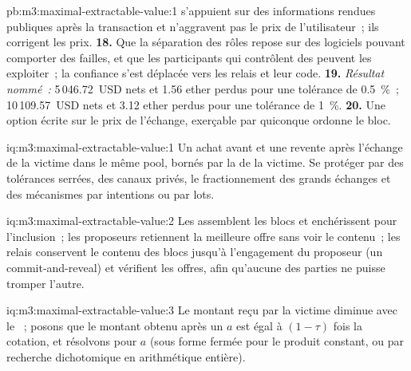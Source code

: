 \begin{solution}{pb:m3:maximal-extractable-value:1}
s'appuient sur des informations rendues publiques après la transaction et n'aggravent pas le prix de l'utilisateur~; ils corrigent les prix. \textbf{18.} Que la
séparation des rôles repose sur des logiciels pouvant comporter des failles, et que les participants qui contrôlent des  peuvent les exploiter~;
la confiance s'est déplacée vers les relais et leur code. \textbf{19.} \emph{Résultat nommé~:} 5\,046.72~USD nets et 1.56 ether perdus pour une tolérance de 0.5~\%~;
10\,109.57~USD nets et 3.12 ether perdus pour une tolérance de 1~\%. \textbf{20.} Une option écrite sur le prix de l'échange, exerçable par quiconque ordonne
le bloc.
\end{solution}

\begin{solution}{iq:m3:maximal-extractable-value:1}
Un achat avant et une revente après l'échange de la victime dans le même pool, bornés par la  de la victime. Se protéger par des
tolérances serrées, des canaux privés, le fractionnement des grands échanges et des mécanismes par intentions ou par lots.
\end{solution}

\begin{solution}{iq:m3:maximal-extractable-value:2}
Les  assemblent les blocs et enchérissent pour l'inclusion~; les proposeurs retiennent la meilleure offre sans voir le contenu~; les relais conservent le
contenu des blocs jusqu'à l'engagement du proposeur (un commit-and-reveal) et vérifient les offres, afin qu'aucune des parties ne puisse tromper l'autre.
\end{solution}

\begin{solution}{iq:m3:maximal-extractable-value:3}
Le montant reçu par la victime diminue avec le ~; posons que le montant obtenu après un  $a$ est égal à $(1 - \tau)$ fois la cotation, et
résolvons pour $a$ (sous forme fermée pour le produit constant, ou par recherche dichotomique en arithmétique entière).
\end{solution}

